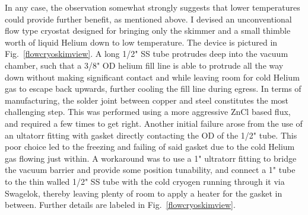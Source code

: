 
In any case, the observation somewhat strongly suggests that lower temperatures could provide further benefit, as mentioned above.
I devised an unconventional flow type cryostat designed for bringing only the skimmer and a small thimble worth of liquid Helium down to low temperature.
The device is pictured in Fig.~\ref{flowcryoskimview}.
A long 1/2" SS tube protrudes deep into the vacuum chamber, such that a 3/8" OD helium fill line is able to protrude all the way down without making significant contact and while leaving room for cold Helium gas to escape back upwards, further cooling the fill line during egress.
In terms of manufacturing, the solder joint between copper and steel constitutes the most challenging step.
This was performed using a more aggressive ZnCl based flux, and required a few times to get right.
Another initial failure arose from the use of an ultatorr fitting with gasket directly contacting the OD of the 1/2" tube.
This poor choice led to the freezing and failing of said gasket due to the cold Helium gas flowing just within.
A workaround was to use a 1" ultratorr fitting to bridge the vacuum barrier and provide some position tunability, and connect a 1" tube to the thin walled 1/2" SS tube with the cold cryogen running through it via Swagelok, thereby leaving plenty of room to apply a heater for the gasket in between.
Further details are labeled in Fig.~\ref{flowcryoskimview}.

